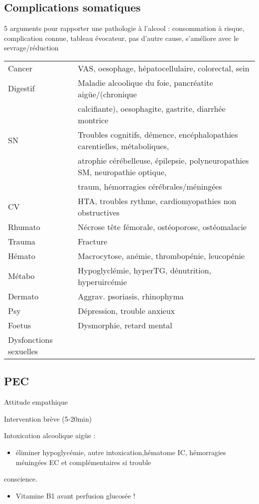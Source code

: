 \documentclass[11pt]{article}
\begin{document}
\subsection{Complications somatiques}
\label{sec:orge5b0ba8}
\begin{tcolorbox}
5 arguments pour rapporter une pathologie à l'alcool : consommation à risque,
 complication connue, tableau évocateur, pas d'autre cause, s'améliore avec le sevrage/réduction
\end{tcolorbox}
\begin{table}[htbp]
\centering
\begin{tabular}{ll}
\toprule
Cancer & VAS, oesophage, hépatocellulaire, colorectal, sein\\
Digestif & Maladie alcoolique du foie, pancréatite aigüe/(chronique\\
 & calcifiante), oesophagite, gastrite, diarrhée montrice\\
SN & Troubles cognitifs, démence, encéphalopathies carentielles, métaboliques,\\
 & atrophie cérébelleuse, épilepsie, polyneuropathies SM, neuropathie optique,\\
 & traum, hémorragies cérébrales/méningées\\
CV & HTA, troubles rythme, cardiomyopathies non obstructives\\
Rhumato & Nécrose tête fémorale, ostéoporose, ostéomalacie\\
Trauma & Fracture\\
Hémato & Macrocytose, anémie, thrombopénie, leucopénie\\
Métabo & Hypoglyclémie, hyperTG, dénutrition, hyperuircémie\\
Dermato & Aggrav. psoriasis, rhinophyma\\
Psy & Dépression, trouble anxieux\\
Foetus & Dysmorphie, retard mental\\
Dysfonctions sexuelles & \\
\bottomrule
\end{tabular}
\end{table}

\subsection{PEC}
\label{sec:org9dd2327}
Attitude empathique

Intervention brève (5-20min)

Intoxication alcoolique aigüe : 
\begin{itemize}
\item éliminer hypoglycémie, autre intoxication,hématome IC, hémorragies méningées \thus EC et complémentaires si trouble
\end{itemize}
conscience. 
\begin{itemize}
\item \danger Vitamine B1 avant perfusion glucosée !
\end{itemize}
\end{document}
